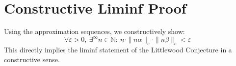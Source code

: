 
\section{Constructive Liminf Proof}
Using the approximation sequences, we constructively show:
\[
\forall \varepsilon > 0,\ \exists^\infty n \in \mathbb{N}:\ n \cdot \|n\alpha\|_c \cdot \|n\beta\|_c < \varepsilon
\]
This directly implies the liminf statement of the Littlewood Conjecture in a constructive sense.
